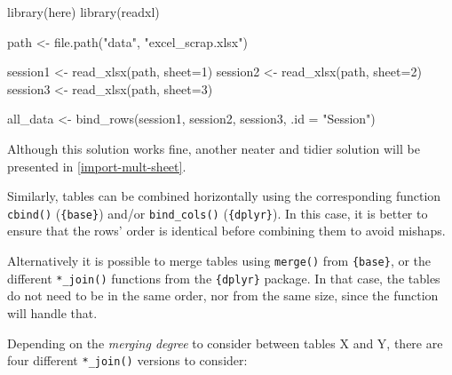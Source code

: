 \documentclass[
]{book}
\newenvironment{Shaded}{\begin{snugshade}}{\end{snugshade}}
\newcommand{\AttributeTok}[1]{\textcolor[rgb]{0.77,0.63,0.00}{#1}}
\newcommand{\DecValTok}[1]{\textcolor[rgb]{0.00,0.00,0.81}{#1}}
\newcommand{\FunctionTok}[1]{\textcolor[rgb]{0.00,0.00,0.00}{#1}}
\newcommand{\NormalTok}[1]{#1}
\newcommand{\OtherTok}[1]{\textcolor[rgb]{0.56,0.35,0.01}{#1}}
\newcommand{\StringTok}[1]{\textcolor[rgb]{0.31,0.60,0.02}{#1}}
\begin{document}
\begin{Shaded}
\begin{Highlighting}[]
\FunctionTok{library}\NormalTok{(here)}
\FunctionTok{library}\NormalTok{(readxl)}

\NormalTok{path }\OtherTok{\textless{}{-}} \FunctionTok{file.path}\NormalTok{(}\StringTok{"data"}\NormalTok{, }\StringTok{"excel\_scrap.xlsx"}\NormalTok{)}

\NormalTok{session1 }\OtherTok{\textless{}{-}} \FunctionTok{read\_xlsx}\NormalTok{(path, }\AttributeTok{sheet=}\DecValTok{1}\NormalTok{)}
\NormalTok{session2 }\OtherTok{\textless{}{-}} \FunctionTok{read\_xlsx}\NormalTok{(path, }\AttributeTok{sheet=}\DecValTok{2}\NormalTok{) }
\NormalTok{session3 }\OtherTok{\textless{}{-}} \FunctionTok{read\_xlsx}\NormalTok{(path, }\AttributeTok{sheet=}\DecValTok{3}\NormalTok{)}

\NormalTok{all\_data }\OtherTok{\textless{}{-}} \FunctionTok{bind\_rows}\NormalTok{(session1, session2, session3, }\AttributeTok{.id =} \StringTok{"Session"}\NormalTok{)}
\end{Highlighting}
\end{Shaded}

Although this solution works fine, another neater and tidier solution will be presented in \ref{import-mult-sheet}.

Similarly, tables can be combined horizontally using the corresponding function \texttt{cbind()} (\texttt{\{base\}}) and/or \texttt{bind\_cols()} (\texttt{\{dplyr\}}). In this case, it is better to ensure that the rows' order is identical before combining them to avoid mishaps.

Alternatively it is possible to merge tables using \texttt{merge()} from \texttt{\{base\}}, or the different \texttt{*\_join()} functions from
the \texttt{\{dplyr\}} package. In that case, the tables do not need to be in the same order, nor from the same size, since the function will handle that.

Depending on the \emph{merging degree} to consider between tables X and Y, there are four different \texttt{*\_join()} versions to consider:
\end{document}

